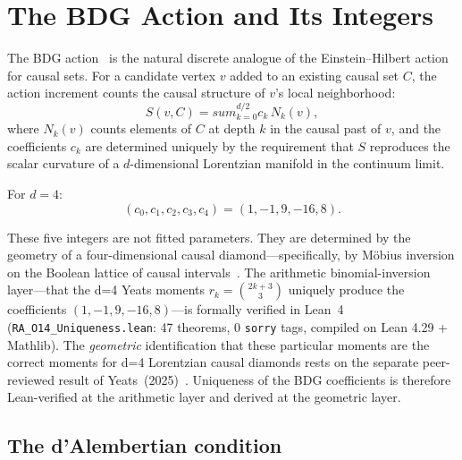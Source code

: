 \documentclass[11pt]{article}
\def\sum{sum}%
\begin{document}
\section{The BDG Action and Its Integers}
\label{sec:bdg}

The BDG action~\cite{Benincasa2010} is the natural discrete analogue of the Einstein--Hilbert action for causal sets. For a candidate vertex $v$ added to an existing causal set $C$, the action increment counts the causal structure of $v$'s local neighborhood:
\begin{equation}
S(v,C) = \sum_{k=0}^{d/2} c_k \, N_k(v),
\end{equation}
where $N_k(v)$ counts elements of $C$ at depth $k$ in the causal past of $v$, and the coefficients $c_k$ are determined uniquely by the requirement that $S$ reproduces the scalar curvature of a $d$-dimensional Lorentzian manifold in the continuum limit.

For $d=4$:
\begin{equation}
\label{eq:bdg_d4}
(c_0,c_1,c_2,c_3,c_4)=(1,-1,9,-16,8).
\end{equation}

These five integers are not fitted parameters. They are determined by the geometry of a four-dimensional causal diamond---specifically, by M\"obius inversion on the Boolean lattice of causal intervals~\cite{Benincasa2010, Dowker2013}. The arithmetic binomial-inversion layer---that the d=4 Yeats moments $r_k=\binom{2k+3}{3}$ uniquely produce the coefficients $(1,-1,9,-16,8)$---is formally verified in Lean~4 (\texttt{RA\_O14\_Uniqueness.lean}: 47 theorems, 0 \texttt{sorry} tags, compiled on Lean 4.29 + Mathlib). The \emph{geometric} identification that these particular moments are the correct moments for d=4 Lorentzian causal diamonds rests on the separate peer-reviewed result of Yeats~(2025)~\cite{Yeats2025}. Uniqueness of the BDG coefficients is therefore Lean-verified at the arithmetic layer and derived at the geometric layer.

\subsection{The d'Alembertian condition}
\end{document}
